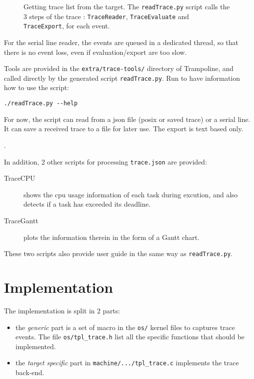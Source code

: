 \begin{figure}[htbp]
    \centering
	\begin{adjustbox}{width=.7\linewidth,keepaspectratio}
		
	\end{adjustbox}
	\caption{Getting trace list from the target. The \lstinline{readTrace.py} script calls the 3 steps of the trace : \lstinline{TraceReader}, \lstinline{TraceEvaluate} and \lstinline{TraceExport}, for each event.}
	\label{fig:trace}
\end{figure}

For the serial line reader, the events are queued in a dedicated thread, so that there is no event loss, even if evaluation/export are too slow.


Tools are provided in the \texttt{extra/trace-tools/} directory of Trampoline, and called directly by the generated script \lstinline{readTrace.py}. Run to have information how to use the script:

\begin{lstlisting}
./readTrace.py --help
\end{lstlisting}

For now, the script can read from a json file (posix or saved trace) or a serial line. It can save a received trace to a file for later use. The export is text based only.

.

In addition, 2 other scripts for processing \texttt{trace.json} are provided:
\begin{description}
	\item[TraceCPU] shows the cpu usage information of each task during excution, and  also detects if a task has exceeded its deadline.
	\item[TraceGantt] plots the information therein in the form of a Gantt chart.
\end{description}

These two scripts also provide user guide in the same way as \lstinline{readTrace.py}.

\section{Implementation}
The implementation is split in 2 parts:
\begin{itemize}
	\item the \emph{generic} part is a set of macro in the \texttt{os/} kernel files to captures trace events. The file \texttt{os/tpl_trace.h} list all the specific functions that should be implemented.
	\item the \emph{target specific} part in \lstinline{machine/.../tpl_trace.c} implements the trace back-end. 
\end{itemize}

